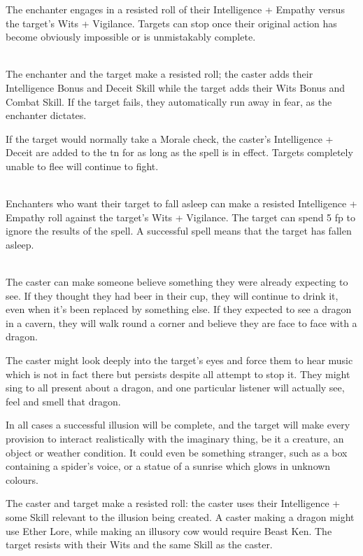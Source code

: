 \begin{multicols}{2}
The enchanter engages in a resisted roll of their Intelligence + Empathy versus the target's Wits + Vigilance. Targets can stop once their original action has become obviously impossible or is unmistakably complete.

\\
The enchanter and the target make a resisted roll; the caster adds their Intelligence Bonus and Deceit Skill while the target adds their Wits Bonus and Combat Skill. If the target fails, they automatically run away in fear, as the enchanter dictates.

If the target would normally take a Morale check, the caster's Intelligence + Deceit are added to the \gls{tn} for as long as the spell is in effect. Targets completely unable to flee will continue to fight.

\\
Enchanters who want their target to fall asleep can make a resisted Intelligence + Empathy roll against the target's Wits + Vigilance. The target can spend 5 \gls{fp} to ignore the results of the spell. A successful spell means that the target has fallen asleep.

\\
The caster can make someone believe something they were already expecting to see.
If they thought they had beer in their cup, they will continue to drink it, even when it's been replaced by something else.
If they expected to see a dragon in a cavern, they will walk round a corner and believe they are face to face with a dragon.

The caster might look deeply into the target's eyes and force them to hear music which is not in fact there but persists despite all attempt to stop it. They might sing to all present about a dragon, and one particular listener will actually see, feel and smell that dragon.

In all cases a successful illusion will be complete, and the target will make every provision to interact realistically with the imaginary thing, be it a creature, an object or weather condition. It could even be something stranger, such as a box containing a spider's voice, or a statue of a sunrise which glows in unknown colours.

The caster and target make a resisted roll: the caster uses their Intelligence + some Skill relevant to the illusion being created. A caster making a dragon might use Ether Lore, while making an illusory cow would require Beast Ken. The target resists with their Wits and the same Skill as the caster.


\end{multicols}
